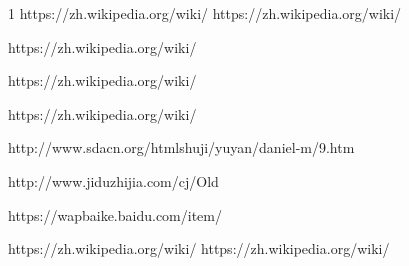 \begin{thebibliography}{1}
   https://zh.wikipedia.org/wiki/%
   https://zh.wikipedia.org/wiki/%

   https://zh.wikipedia.org/wiki/%
  
    https://zh.wikipedia.org/wiki/%
  
     https://zh.wikipedia.org/wiki/%

    http://www.sdacn.org/htmlshuji/yuyan/daniel-m/9.htm

     http://www.jiduzhijia.com/cj/Old%
   
     https://wapbaike.baidu.com/item/%

     https://zh.wikipedia.org/wiki/%
     https://zh.wikipedia.org/wiki/%





  \end{thebibliography}

